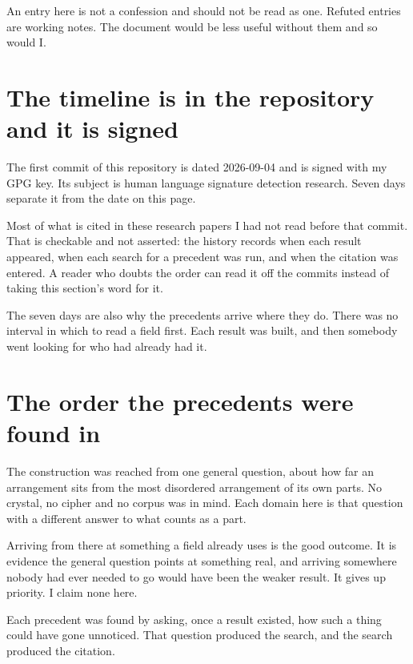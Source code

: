 An entry here is not a confession and should not be read as one. Refuted entries are
working notes. The document would be less useful without them and so would I.

\section*{The timeline is in the repository and it is signed}

The first commit of this repository is dated 2026-09-04 and is signed with my GPG key. Its subject is
human language signature detection research. Seven days separate it from the date on this page.

Most of what is cited in these research papers I had not read before that commit. That is checkable and not
asserted: the history records when each result appeared, when each search for a precedent was
run, and when the citation was entered. A reader who doubts the order can read it off the commits
instead of taking this section's word for it.

The seven days are also why the precedents arrive where they do. There was no interval in which to
read a field first. Each result was built, and then somebody went looking for who had already had
it.

\section*{The order the precedents were found in}

The construction was reached from one general question, about how far an arrangement sits from the
most disordered arrangement of its own parts. No crystal, no cipher and no corpus was in mind. Each
domain here is that question with a different answer to what counts as a part.

Arriving from there at something a field already uses is the good outcome. It is evidence the
general question points at something real, and arriving somewhere nobody had ever needed to go would
have been the weaker result. It gives up priority. I claim none here.

Each precedent was found by asking, once a result existed, how such a thing could have gone
unnoticed. That question produced the search, and the search produced the citation.

